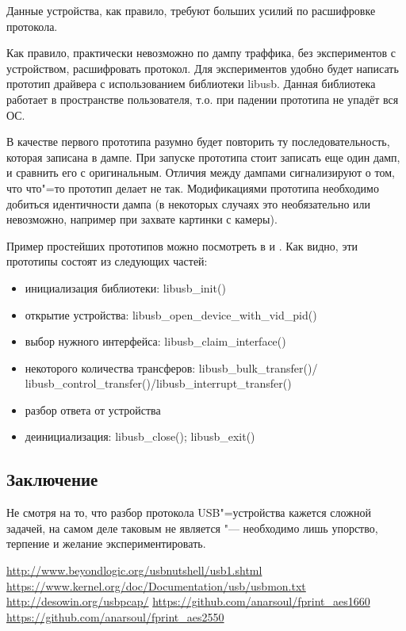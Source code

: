\documentclass[10pt, a5paper]{article}
\begin{document}
Данные устройства, как правило, требуют больших усилий по расшифровке протокола.

Как правило, практически невозможно по дампу траффика, без экспериментов с устройством, расшифровать протокол. Для экспериментов удобно будет написать прототип драйвера с использованием библиотеки libusb. Данная библиотека работает в пространстве пользователя, т.о. при падении прототипа не упадёт вся ОС.

В качестве первого прототипа разумно будет повторить ту последовательность, которая записана в дампе. При запуске прототипа стоит записать еще один дамп, и сравнить его с оригинальным. Отличия между дампами сигнализируют о том, что что"=то прототип делает не так. Модификациями прототипа необходимо добиться идентичности дампа (в некоторых случаях это необязательно или невозможно, например при захвате картинки с камеры).

Пример простейших прототипов можно посмотреть в \cite{Anar4} и \cite{Anar5}. Как видно, эти прототипы состоят из следующих частей:

\begin{itemize}
  \item инициализация библиотеки: libusb\_init()
  \item открытие устройства: libusb\_open\_device\_with\_vid\_pid()
  \item выбор нужного интерфейса:  libusb\_claim\_interface()
  \item некоторого количества трансферов: libusb\_bulk\_transfer()/ \linebreak libusb\_control\_transfer()/libusb\_interrupt\_transfer()
  \item разбор ответа от устройства
  \item деинициализация: libusb\_close(); libusb\_exit()
\end{itemize}

\subsection*{Заключение}

Не смотря на то, что разбор протокола USB"=устройства кажется сложной задачей, на самом деле таковым не является "--- необходимо лишь упорство, терпение и желание экспериментировать.

\begin{thebibliography}{9}
 \url{http://www.beyondlogic.org/usbnutshell/usb1.shtml}
 \url{https://www.kernel.org/doc/Documentation/usb/usbmon.txt}
 \url{http://desowin.org/usbpcap/}
 \url{https://github.com/anarsoul/fprint\_aes1660}
 \url{https://github.com/anarsoul/fprint\_aes2550}
\end{thebibliography}
\end{document}
